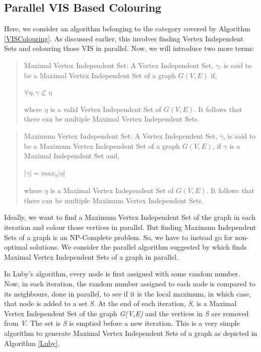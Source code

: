 \documentclass[MTech]{iitmdiss}
\begin{document}
\subsection{Parallel VIS Based Colouring}
Here, we consider an algorithm belonging to the category covered by Algorithm \ref{VISColouring}. As discussed earlier, this involves finding Vertex Independent Sets and colouring those VIS in parallel. Now, we will introduce two more terms:
\begin{verse}
Maximal Vertex Independent Set: A Vertex Independent Set, $\gamma$, is said to be a Maximal Vertex Independent Set of a graph $G(V,E)$ if,
\begin{center}
$\forall \eta, \gamma \not\subset \eta$ 
\end{center}
where $\eta$ is a valid Vertex Independent Set of $G(V,E)$. It follows that there can be multiple Maximal Vertex Independent Sets.
\end{verse}
\begin{verse}
Maximum Vertex Independent Set: A Vertex Independent Set, $\gamma$, is said to be a Maximum Vertex Independent Set of a graph $G(V,E)$, if $\gamma$ is a Maximal Independent Set and,
\begin{center}
$|\gamma| = max_{\eta}|\eta|$ 
\end{center}
where $\eta$ is a Maximal Vertex Independent Set of $G(V,E)$. It follows that there can be multiple Maximum Vertex Independent Sets.
\end{verse}
Ideally, we want to find a Maximum Vertex Independent Set of the graph in each iteration and colour those vertices in parallel. But finding Maximum Independent Sets of a graph is an NP-Complete problem. So, we have to instead go for non-optimal solutions. We consider the parallel algorithm suggested by \citet{Luby:1985:SPA:22145.22146} which finds Maximal Vertex Independent Sets of a graph in parallel.

In Luby's algorithm, every node is first assigned with some random number. Now, in each iteration, the random number assigned to each node is compared to its neighbours, done in parallel, to see if it is the local maximum, in which case, that node is added to a set \textit{S}. At the end of each iteration, \textit{S}, is a Maximal Vertex Independent Set of the graph \textit{G(V,E)} and the vertices in \textit{S} are removed from \textit{V}. The set is \textit{S} is emptied before a new iteration. This is a very simple algorithm to generate Maximal Vertex Independent Sets of a graph as depicted in Algorithm \ref{Luby}.
\end{document}
